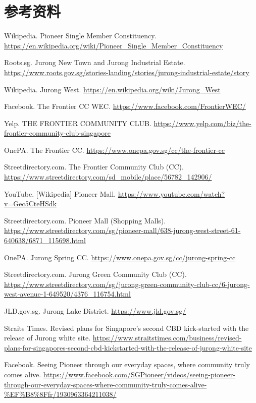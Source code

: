 \documentclass[11pt,a4paper,twoside,openany]{book}
\begin{document}
\section*{参考资料}
\begin{enumerate}[label={[\arabic*]},leftmargin=*,topsep=2pt,itemsep=1pt,parsep=0pt]
  \item Wikipedia. Pioneer Single Member Constituency. \url{https://en.wikipedia.org/wiki/Pioneer_Single_Member_Constituency}
  \item Roots.sg. Jurong New Town and Jurong Industrial Estate. \url{https://www.roots.gov.sg/stories-landing/stories/jurong-industrial-estate/story}
  \item Wikipedia. Jurong West. \url{https://en.wikipedia.org/wiki/Jurong_West}
  \item Facebook. The Frontier CC WEC. \url{https://www.facebook.com/FrontierWEC/}
  \item Yelp. THE FRONTIER COMMUNITY CLUB. \url{https://www.yelp.com/biz/the-frontier-community-club-singapore}
  \item OnePA. The Frontier CC. \url{https://www.onepa.gov.sg/cc/the-frontier-cc}
  \item Streetdirectory.com. The Frontier Community Club (CC). \url{https://www.streetdirectory.com/sd_mobile/place/56782_142906/}
  \item YouTube. [Wikipedia] Pioneer Mall. \url{https://www.youtube.com/watch?v=Gec5CteHSdk}
  \item Streetdirectory.com. Pioneer Mall (Shopping Malls). \url{https://www.streetdirectory.com/sg/pioneer-mall/638-jurong-west-street-61-640638/6871_115698.html}
  \item OnePA. Jurong Spring CC. \url{https://www.onepa.gov.sg/cc/jurong-spring-cc}
  \item Streetdirectory.com. Jurong Green Community Club (CC). \url{https://www.streetdirectory.com/sg/jurong-green-community-club-cc/6-jurong-west-avenue-1-649520/4376_116754.html}
  \item JLD.gov.sg. Jurong Lake District. \url{https://www.jld.gov.sg/}
  \item Straits Times. Revised plans for Singapore's second CBD kick-started with the release of Jurong white site. \url{https://www.straitstimes.com/business/revised-plans-for-singapores-second-cbd-kickstarted-with-the-release-of-jurong-white-site}
  \item Facebook. Seeing Pioneer through our everyday spaces, where community truly comes alive. \url{https://www.facebook.com/SGPioneer/videos/seeing-pioneer-through-our-everyday-spaces-where-community-truly-comes-alive-%EF%B8%8Ffr/1930963364211038/}

\end{enumerate}
\end{document}
